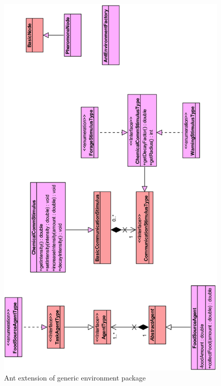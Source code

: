 \begin{figure}[H]
  \centering
  \includegraphics[width=0.8\linewidth]{gfx/ant-env.png}
  \caption{Ant extension of generic environment package}
  \label{fig:ant-env}
\end{figure}

